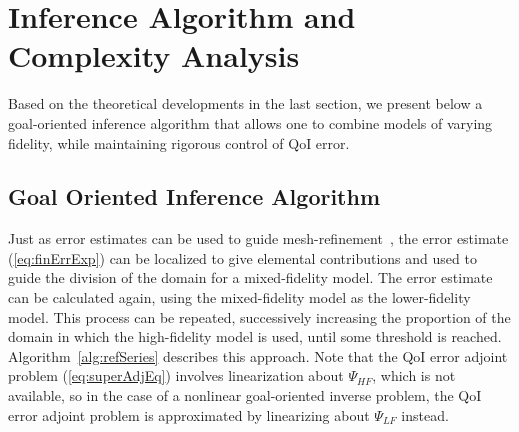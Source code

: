 \section{Inference Algorithm and Complexity Analysis}\label{sect:alg}
%
Based on the theoretical developments in the last section, we present below a goal-oriented inference algorithm that allows one to combine models of varying fidelity, while maintaining rigorous control of QoI error.
%
\subsection{Goal Oriented Inference Algorithm}
%
Just as error estimates can be used to guide mesh-refinement~\cite{BecRann01}, the error estimate (\cref{eq:finErrExp}) can be localized to give elemental contributions and used to guide the division of the domain for a mixed-fidelity model. The error estimate can be calculated again, using the mixed-fidelity model as the lower-fidelity model. This process can be repeated, successively increasing the proportion of the domain in which the high-fidelity model is used, until some threshold is reached. Algorithm~\cref{alg:refSeries} describes this approach. Note that the QoI error adjoint problem (\cref{eq:superAdjEq}) involves linearization about $\Psi_{HF}$, which is not available, so in the case of a nonlinear goal-oriented inverse problem, the QoI error adjoint problem is approximated by linearizing about $\Psi_{LF}$ instead.
%
